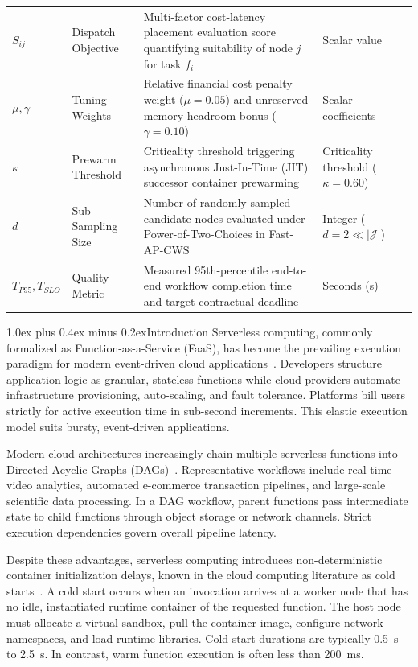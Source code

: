 \documentclass[conference]{IEEEtran}
\makeatletter
\def\section{\@startsection{section}{1}{\z@}{2.4ex plus 1.0ex minus 0.5ex}%
{1.0ex plus 0.4ex minus 0.2ex}{\normalfont\large\bfseries\color{ieeeblue}}}
\makeatother
\begin{document}
\begin{table}[t]
{\begin{tabular}{llll}
\rowcolor{tablerowalt}
$S_{ij}$ & Dispatch Objective & Multi-factor cost-latency placement evaluation score quantifying suitability of node $j$ for task $f_i$ & Scalar value \\
$\mu, \gamma$ & Tuning Weights & Relative financial cost penalty weight ($\mu = 0.05$) and unreserved memory headroom bonus ($\gamma = 0.10$) & Scalar coefficients \\
\rowcolor{tablerowalt}
$\kappa$ & Prewarm Threshold & Criticality threshold triggering asynchronous Just-In-Time (JIT) successor container prewarming & Criticality threshold ($\kappa = 0.60$) \\
$d$ & Sub-Sampling Size & Number of randomly sampled candidate nodes evaluated under Power-of-Two-Choices in Fast-AP-CWS & Integer ($d = 2 \ll |\mathcal{J}|$) \\
\rowcolor{tablerowalt}
$T_{P95}, T_{SLO}$ & Quality Metric & Measured 95th-percentile end-to-end workflow completion time and target contractual deadline & Seconds (s) \\
\bottomrule
\end{tabular}%
}
\end{table}

\section{Introduction}
\label{sec:intro}
Serverless computing, commonly formalized as Function-as-a-Service (FaaS), has become the prevailing execution paradigm for modern event-driven cloud applications~\cite{shahrad2020serverless, openwhisk2023}. Developers structure application logic as granular, stateless functions while cloud providers automate infrastructure provisioning, auto-scaling, and fault tolerance. Platforms bill users strictly for active execution time in sub-second increments. This elastic execution model suits bursty, event-driven applications.

Modern cloud architectures increasingly chain multiple serverless functions into Directed Acyclic Graphs (DAGs)~\cite{li2022faasflow, yu2023pheromone, carver2020wukong}. Representative workflows include real-time video analytics, automated e-commerce transaction pipelines, and large-scale scientific data processing. In a DAG workflow, parent functions pass intermediate state to child functions through object storage or network channels. Strict execution dependencies govern overall pipeline latency.

Despite these advantages, serverless computing introduces non-deterministic container initialization delays, known in the cloud computing literature as cold starts~\cite{shahrad2020serverless}. A cold start occurs when an invocation arrives at a worker node that has no idle, instantiated runtime container of the requested function. The host node must allocate a virtual sandbox, pull the container image, configure network namespaces, and load runtime libraries. Cold start durations are typically 0.5~s to 2.5~s. In contrast, warm function execution is often less than 200~ms.
\end{document}
